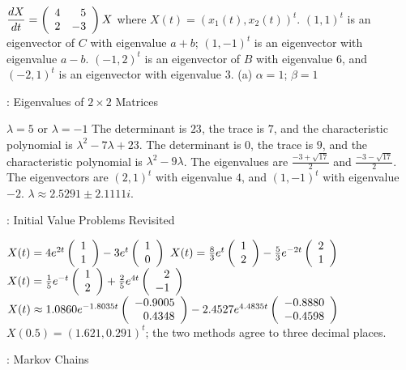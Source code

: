 $\displaystyle\frac{dX}{dt} = \left(\begin{array}{rr} 4 & 5\\ 2 &-3\end{array}\right)X$ where $X(t)=(x_1(t),x_2(t))^t$.
 \ans $(1,1)^t$ is an eigenvector of $C$ with eigenvalue $a + b$; 
$(1,-1)^t$ is an eigenvector with eigenvalue $a - b$.
 $(-1,2)^t$ is an eigenvector of $B$ with eigenvalue $6$, and 
$(-2,1)^t$ is an eigenvector with eigenvalue $3$.
 (a) \ans $\alpha = 1$; $\beta = 1$ 


:  Eigenvalues of $2\times 2$ Matrices

\ans $\lambda = 5$ or $\lambda = -1$
 The determinant is $23$, the trace is $7$, and
the characteristic polynomial is $\lambda^2-7\lambda+23$.
 The determinant is $0$, the trace is $9$, and
the characteristic polynomial is $\lambda^2-9\lambda$.
 \ans The eigenvalues are $\frac{-3 + \sqrt{17}}{2}$ and 
$\frac{-3 - \sqrt{17}}{2}$.
 The eigenvectors are $(2,1)^t$ with eigenvalue
$4$, and $(1,-1)^t$ with eigenvalue $-2$.
 \ans  $\lambda \approx 2.5291 \pm 2.1111i$.



: Initial Value Problems Revisited

 \ans $X(t) = 4e^{2t}\left(\begin{array}{r} 1 \\ 1\end{array}\right) - 3e^t\left(\begin{array}{r} 1 \\ 0\end{array}\right)$
 \ans $X(t) = \frac{8}{3}e^t\left(\begin{array}{r} 1 \\ 2\end{array}\right) - 
\frac{5}{3}e^{-2t}\left(\begin{array}{r} 2 \\ 1\end{array}\right)$
 \ans $X(t) = \frac{1}{5}e^{-t}\left(\begin{array}{r} 1 \\ 2\end{array}\right) + 
\frac{2}{5}e^{4t}\left(\begin{array}{r} 2 \\ -1\end{array}\right)$
 \ans $X(t) \approx 1.0860e^{-1.8035t}\left(\begin{array}{r} -0.9005 \\  0.4348\end{array}\right)
- 2.4527e^{4.4835t}\left(\begin{array}{r} -0.8880 \\ -0.4598\end{array}\right)$
 \ans $X(0.5) = (1.621,0.291)^t$; the two methods agree to 
three decimal places.


: Markov Chains

